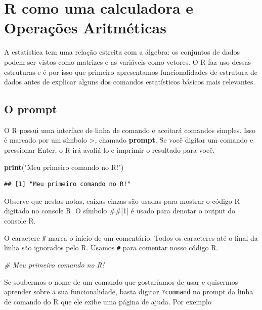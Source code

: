 \documentclass[
]{book}
\newenvironment{Shaded}{\begin{snugshade}}{\end{snugshade}}
\newcommand{\CommentTok}[1]{\textcolor[rgb]{0.56,0.35,0.01}{\textit{#1}}}
\newcommand{\FunctionTok}[1]{\textcolor[rgb]{0.13,0.29,0.53}{\textbf{#1}}}
\newcommand{\NormalTok}[1]{#1}
\newcommand{\StringTok}[1]{\textcolor[rgb]{0.31,0.60,0.02}{#1}}
\begin{document}
\chapter{R como uma calculadora e Operações Aritméticas}\label{r-como-uma-calculadora-e-operauxe7uxf5es-aritmuxe9ticas}

A estatística tem uma relação estreita com a álgebra: os conjuntos de dados podem ser vistos como matrizes e as variáveis como vetores. O R faz uso dessas estruturas e é por isso que primeiro apresentamos funcionalidades de estrutura de dados antes de explicar alguns dos comandos estatísticos básicos mais relevantes.

\section{O prompt}\label{o-prompt}

O R possui uma interface de linha de comando e aceitará comandos simples. Isso é marcado por um símbolo \textgreater, chamado \textbf{prompt}. Se você digitar um comando e pressionar Enter, o R irá avaliá-lo e imprimir o resultado para você.

\begin{Shaded}
\begin{Highlighting}[]
\FunctionTok{print}\NormalTok{(}\StringTok{"Meu primeiro comando no R!"}\NormalTok{)}
\end{Highlighting}
\end{Shaded}

\begin{verbatim}
## [1] "Meu primeiro comando no R!"
\end{verbatim}

Observe que nestas notas, caixas cinzas são usadas para mostrar o código R digitado no console R. O símbolo \#\#{[}1{]} é usado para denotar o output do console R.

O caractere \texttt{\#} marca o início de um comentário. Todos os caracteres até o final da linha são ignorados pelo R. Usamos \texttt{\#} para comentar nosso código R.

\begin{Shaded}
\begin{Highlighting}[]
\CommentTok{\# Meu primeiro comando no R!}
\end{Highlighting}
\end{Shaded}

Se soubermos o nome de um comando que gostaríamos de usar e quisermos aprender sobre a sua funcionalidade, basta digitar \texttt{?command} no prompt da linha de comando do R que ele exibe uma página de ajuda. Por exemplo
\end{document}
